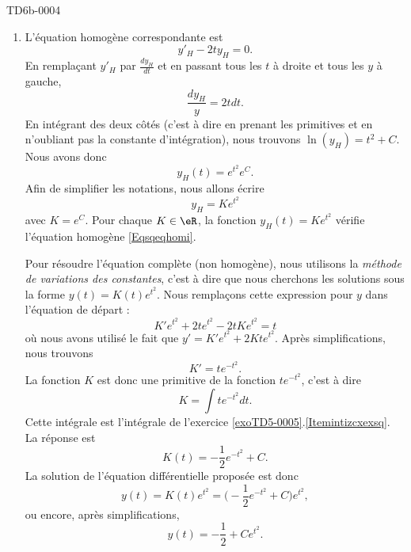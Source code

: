 
\begin{corrige}{TD6b-0004}

	\begin{enumerate}
		\item
			L'équation homogène correspondante est
			\begin{equation}		\label{Eqsqeqhomi}
				y'_H-2ty_H=0.
			\end{equation}
			En remplaçant $y'_H$ par $\frac{ dy_H }{ dt }$ et en passant tous les $t$ à droite et tous les $y$ à gauche,
			\begin{equation}
				\frac{ dy_H }{ y }=2tdt.
			\end{equation}
			En intégrant des deux côtés (c'est à dire en prenant les primitives et en n'oubliant pas la constante d'intégration), nous trouvons $\ln(y_H)=t^2+C$. Nous avons donc
			\begin{equation}
				y_H(t)= e^{t^2} e^{C}.
			\end{equation}
			Afin de simplifier les notations, nous allons écrire
			\begin{equation}
				y_H= Ke^{t^2}
			\end{equation}
			avec $K= e^{C}$. Pour chaque $K\in \eR$, la fonction $y_H(t)=K e^{t^2}$ vérifie l'équation homogène \eqref{Eqsqeqhomi}.

			Pour résoudre l'équation complète (non homogène), nous utilisons la \emph{méthode de variations des constantes}, c'est à dire que nous cherchons les solutions sous la forme $y(t)=K(t) e^{t^2}$. Nous remplaçons cette expression pour $y$ dans l'équation de départ :
			\begin{equation}
				K' e^{t^2}+2t e^{t^2}-2tK e^{t^2}=t
			\end{equation}
			où nous avons utilisé le fait que $y'=K' e^{t^2}+2Kt e^{t^2}$. Après simplifications, nous trouvons
			\begin{equation}
				K'=t e^{-t^2}.
			\end{equation}
			La fonction $K$ est donc une primitive de la fonction $t e^{-t^2}$, c'est à dire
			\begin{equation}
				K=\int t e^{-t^2}dt.
			\end{equation}
			Cette intégrale est l'intégrale de l'exercice \ref{exoTD5-0005}.\ref{Itemintizcxexsq}. La réponse est
			\begin{equation}
				K(t)=-\frac{ 1 }{2} e^{-t^2}+C.
			\end{equation}
			La solution de l'équation différentielle proposée est donc
			\begin{equation}
				y(t)=K(t) e^{t^2}=\big( -\frac{ 1 }{2} e^{-t^2}+C \big) e^{t^2},
			\end{equation}
			ou encore, après simplifications, 
			\begin{equation}
				y(t)=-\frac{ 1 }{2}+C e^{t^2}.
			\end{equation}
			

\end{enumerate}
\end{corrige}
